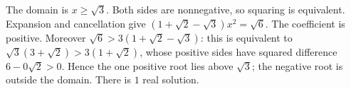 The domain is $x\ge\sqrt3$. Both sides are nonnegative, so squaring is equivalent. Expansion and cancellation give $(1+\sqrt2-\sqrt3)x^2=\sqrt6$. The coefficient is positive. Moreover $\sqrt6>3(1+\sqrt2-\sqrt3)$: this is equivalent to $\sqrt3(3+\sqrt2)>3(1+\sqrt2)$, whose positive sides have squared difference $6-0\sqrt2>0$. Hence the one positive root lies above $\sqrt3$; the negative root is outside the domain. There is $\boxed1$ real solution.
